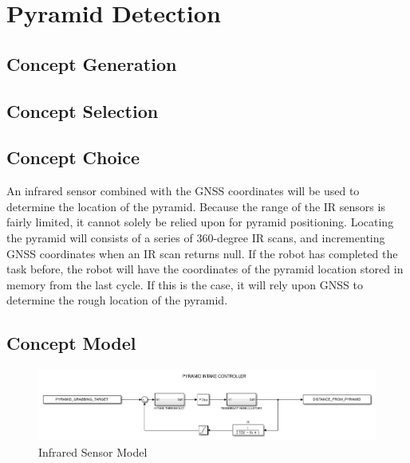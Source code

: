 \documentclass[12pt]{article}
\begin{document}
\section{Pyramid Detection}
\subsection{Concept Generation}
\subsection{Concept Selection}
\subsection{Concept Choice}
An infrared sensor combined with the GNSS coordinates will be used to determine the location of the pyramid. Because the range of the IR sensors is fairly limited, it cannot solely be relied upon for pyramid positioning. Locating the pyramid will consists of a series of 360-degree IR scans, and incrementing GNSS coordinates when an IR scan returns null. If the robot has completed the task before, the robot will have the coordinates of the pyramid location stored in memory from the last cycle. If this is the case, it will rely upon GNSS to determine the rough location of the pyramid. 
\subsection{Concept Model}
\begin{figure}[htb!]
\begin{center}
\includegraphics[scale=0.75]{Figures/simulink_pyramid}
\caption{Infrared Sensor Model}
\end{center}
\end{figure}
\FloatBarrier

\clearpage
\end{document}
